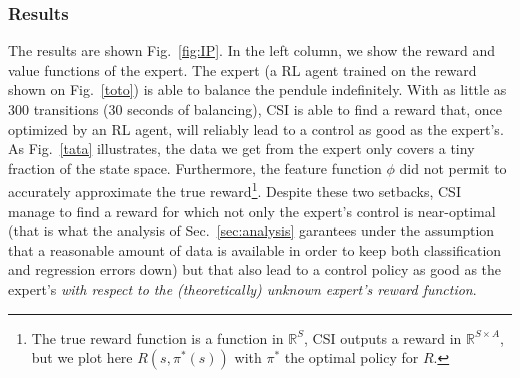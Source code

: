 \documentclass[smallextended]{svjour3}
\begin{document}
\subsubsection{Results}
The results are shown Fig.~\ref{fig:IP}. In the left column, we show the reward and value functions of the expert. The expert (a RL agent trained on the  reward shown on Fig.~\ref{toto}) is able to balance the pendule indefinitely. With as little as 300 transitions (30 seconds of balancing), CSI is able to find a reward that, once optimized by an RL agent, will reliably lead to a control as good as the expert's. As Fig.~\ref{tata} illustrates, the data we get from the expert only covers a tiny fraction of the state space. Furthermore, the feature function $\phi$ did not permit to accurately approximate the true reward\footnote{The true reward function is a function in $\mathbb{R}^S$, CSI outputs a reward in $\mathbb{R}^{S\times A}$, but we plot here $R(s,\pi^*(s))$ with $\pi^*$ the optimal policy for $R$.}. Despite these two setbacks, CSI manage to find a reward for which not only the expert's control is near-optimal (that is what the analysis of Sec.~\ref{sec:analysis} garantees under the assumption that a reasonable amount of data is available in order to keep both classification and regression errors down) but that also lead to a control policy as good as the expert's \emph{with respect to the (theoretically) unknown expert's reward function}.
\end{document}

